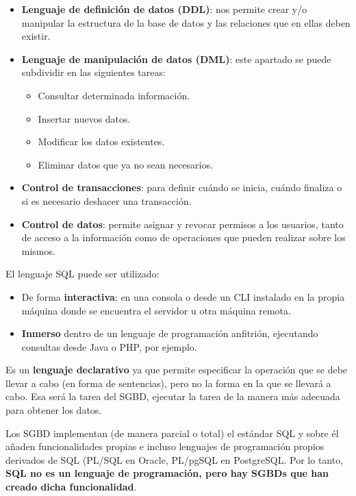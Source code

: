 \begin{itemize}
    \item \textbf{Lenguaje de definición de datos (DDL)}: nos permite crear y/o manipular la estructura de la base de datos y las relaciones que en ellas deben existir.
    \item \textbf{Lenguaje de manipulación de datos (DML)}: este apartado se puede subdividir en las siguientes tareas:
    \begin{itemize}
        \item Consultar determinada información.
        \item Insertar nuevos datos.
        \item Modificar los datos existentes.
        \item Eliminar datos que ya no sean necesarios.
    \end{itemize}
    \item \textbf{Control de transacciones}: para definir cuándo se inicia, cuándo finaliza o si es necesario deshacer una transacción.
    \item \textbf{Control de datos}: permite asignar y revocar permisos a los usuarios, tanto de acceso a la información como de operaciones que pueden realizar sobre los mismos.
\end{itemize}

El lenguaje SQL puede ser utilizado:

\begin{itemize}
    \item De forma \textbf{interactiva}: en una consola o desde un CLI instalado en la propia máquina donde se encuentra el servidor u otra máquina remota.
    \item \textbf{Inmerso} dentro de un lenguaje de programación anfitrión, ejecutando consultas desde Java o PHP, por ejemplo.
\end{itemize}

Es un \textbf{lenguaje declarativo} ya que permite especificar la operación que se debe llevar a cabo (en forma de sentencias), pero no la forma en la que se llevará a cabo. Esa será la tarea del SGBD, ejecutar la tarea de la manera más adecuada para obtener los datos.

Los SGBD implementan (de manera parcial o total) el estándar SQL y sobre él añaden funcionalidades propias e incluso lenguajes de programación propios derivados de SQL (PL/SQL en Oracle, PL/pgSQL en PostgreSQL. Por lo tanto, \textbf{SQL no es un lenguaje de programación, pero hay SGBDs que han creado dicha funcionalidad}.

